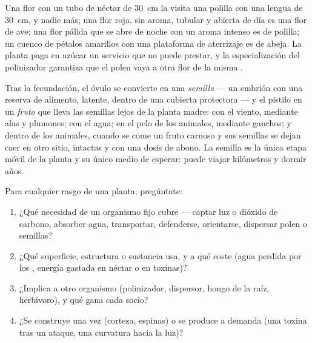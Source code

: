 \begin{example}\label{ex:g12:plant-rooted-life:match}
Una flor con un tubo de néctar de \qty{30}{cm} la visita una polilla
con una lengua de \qty{30}{cm}, y nadie más; una flor roja, sin aroma,
tubular y abierta de día es una flor de ave; una flor pálida que se
abre de noche con un aroma intenso es de polilla; un cuenco de pétalos
amarillos con una plataforma de aterrizaje es de abeja. La planta paga
en azúcar un servicio que no puede prestar, y la especialización del
polinizador garantiza que el polen vaya a otra flor de la misma
.
\end{example}

\begin{proposition}\label{prop:g12:plant-rooted-life:dispersal}
Tras la fecundación, el óvulo se convierte en una \emph{semilla} --- un
embrión con una reserva de alimento, latente, dentro de una cubierta
protectora --- y el pistilo en un \emph{fruto} que lleva las semillas
lejos de la planta madre: con el viento, mediante alas y plumones; con
el agua; en el pelo de los animales, mediante ganchos; y dentro de los
animales, cuando se come un fruto carnoso y sus semillas se dejan caer
en otro sitio, intactas y con una dosis de abono. La semilla es la
única etapa móvil de la planta y su único medio de esperar: puede
viajar kilómetros y dormir años.
\end{proposition}
\admitted

\begin{method}\label{met:g12:plant-rooted-life:read}
Para cualquier rasgo de una planta, pregúntate:
\begin{enumerate}
  \item ¿Qué necesidad de un organismo fijo cubre --- captar luz o
        dióxido de carbono, absorber agua, transportar, defenderse,
        orientarse, dispersar polen o semillas?
  \item ¿Qué superficie, estructura o sustancia usa, y a qué coste
        (agua perdida por los , energía gastada en néctar o en
        toxinas)?
  \item ¿Implica a otro organismo (polinizador, dispersor, hongo de la
        raíz, herbívoro), y qué gana cada socio?
  \item ¿Se construye una vez (corteza, espinas) o se produce a demanda
        (una toxina tras un ataque, una curvatura hacia la luz)?
\end{enumerate}
\end{method}

